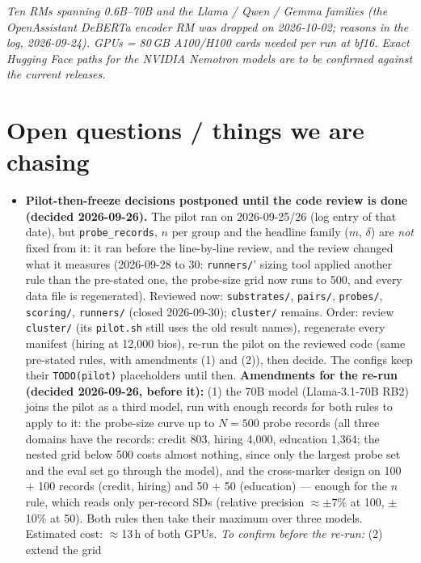 \documentclass{article}
\begin{document}
\emph{Ten RMs spanning 0.6B--70B and the Llama / Qwen / Gemma families (the OpenAssistant DeBERTa encoder RM was
dropped on 2026-10-02; reasons in the log, 2026-09-24). GPUs = 80\,GB A100/H100
cards needed per run at bf16. Exact Hugging Face paths for the NVIDIA Nemotron models are to be confirmed
against the current releases.}

\section{Open questions / things we are chasing}
\begin{itemize}
  \item \textbf{Pilot-then-freeze decisions postponed until the code review is done (decided 2026-09-26).} The pilot
        ran on 2026-09-25/26 (log entry of that date), but \texttt{probe\_records}, $n$ per group and the headline
        family ($m$, $\delta$) are \emph{not} fixed from it: it ran before the line-by-line review, and the review
        changed what it measures (2026-09-28 to 30: \texttt{runners/}' sizing tool applied another rule than the
        pre-stated one, the probe-size grid now runs to 500, and every data file is regenerated). Reviewed now:
        \texttt{substrates/}, \texttt{pairs/}, \texttt{probes/}, \texttt{scoring/}, \texttt{runners/} (closed
        2026-09-30); \texttt{cluster/} remains. Order: review \texttt{cluster/} (its \texttt{pilot.sh} still uses the
        old result names), regenerate every manifest (hiring at 12{,}000 bios), re-run the pilot on the reviewed code
        (same pre-stated rules, with amendments (1) and (2)), then decide. The configs keep their
        \texttt{TODO(pilot)} placeholders until then.
        \textbf{Amendments for the re-run (decided 2026-09-26, before it):} (1) the 70B model
        (Llama-3.1-70B RB2) joins the pilot as a third model, run with enough records for both rules to apply to
        it: the probe-size curve up to $N=500$ probe records (all three domains have the records: credit 803,
        hiring 4{,}000, education 1{,}364; the nested grid below 500 costs almost nothing, since only the largest
        probe set and the eval set go through the model), and the cross-marker design on 100 $+$ 100 records
        (credit, hiring) and 50 $+$ 50 (education) --- enough for the $n$ rule, which reads only per-record SDs
        (relative precision $\approx\pm$7\% at 100, $\pm$10\% at 50). Both rules then take their maximum over three
        models. Estimated cost: $\approx$13\,h of both GPUs. \emph{To confirm before the re-run:} (2) extend the grid

\end{itemize}
\end{document}

